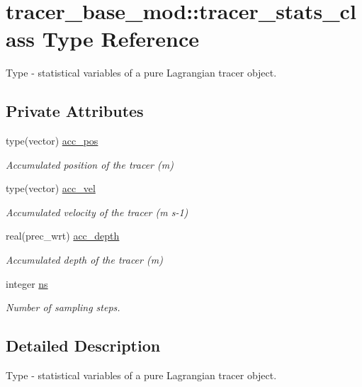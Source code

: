 \hypertarget{structtracer__base__mod_1_1tracer__stats__class}{}\section{tracer\+\_\+base\+\_\+mod\+:\+:tracer\+\_\+stats\+\_\+class Type Reference}
\label{structtracer__base__mod_1_1tracer__stats__class}


Type -\/ statistical variables of a pure Lagrangian tracer object.  


\subsection*{Private Attributes}
\begin{DoxyCompactItemize}
\item 
type(vector) \hyperlink{structtracer__base__mod_1_1tracer__stats__class_aa60964087b2515e7ae6824f38470594e}{acc\+\_\+pos}
\begin{DoxyCompactList}\small\item\em Accumulated position of the tracer (m) \end{DoxyCompactList}\item 
type(vector) \hyperlink{structtracer__base__mod_1_1tracer__stats__class_adab48ad9efa9431a5101e6f22c6b16d1}{acc\+\_\+vel}
\begin{DoxyCompactList}\small\item\em Accumulated velocity of the tracer (m s-\/1) \end{DoxyCompactList}\item 
real(prec\+\_\+wrt) \hyperlink{structtracer__base__mod_1_1tracer__stats__class_ace9d4e6796a669eba7001671ab0b38b8}{acc\+\_\+depth}
\begin{DoxyCompactList}\small\item\em Accumulated depth of the tracer (m) \end{DoxyCompactList}\item 
integer \hyperlink{structtracer__base__mod_1_1tracer__stats__class_a5e01cdc2592ecf31711151cf54e3b4d5}{ns}
\begin{DoxyCompactList}\small\item\em Number of sampling steps. \end{DoxyCompactList}\end{DoxyCompactItemize}


\subsection{Detailed Description}
Type -\/ statistical variables of a pure Lagrangian tracer object. 

